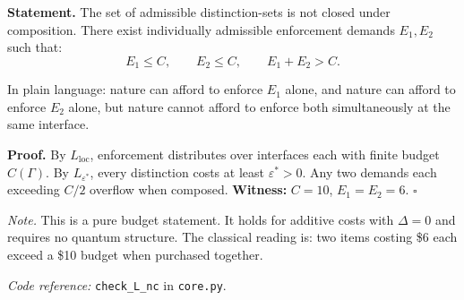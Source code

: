 \documentclass[11pt]{article}
\newcommand{\coderef}[2]{\smallskip\noindent\textit{Code reference:} \texttt{#1} in \texttt{#2}.}
\begin{document}
\begin{tcolorbox}[apfbox, title={Lemma $L_{\mathrm{nc}}^{\mathrm{budget}}$ (Budget Non-Closure)}]
\textbf{Statement.}  The set of admissible distinction-sets is not closed under composition.  There exist individually admissible enforcement demands $E_1, E_2$ such that:
\begin{equation}
E_1 \le C, \qquad E_2 \le C, \qquad E_1 + E_2 > C.
\label{eq:nonclosure}
\end{equation}

In plain language: nature can afford to enforce $E_1$ alone, and nature can afford to enforce $E_2$ alone, but nature cannot afford to enforce both simultaneously at the same interface.

\smallskip\noindent\textbf{Proof.}  By $L_{\mathrm{loc}}$, enforcement distributes over interfaces each with finite budget $C(\Gamma)$.  By $L_{\varepsilon^*}$, every distinction costs at least $\varepsilon^* > 0$.  Any two demands each exceeding $C/2$ overflow when composed.  \textbf{Witness:} $C = 10$, $E_1 = E_2 = 6$.  $\square$

\smallskip\noindent\textit{Note.}  This is a pure budget statement.  It holds for additive costs with $\Delta = 0$ and requires no quantum structure.  The classical reading is: two items costing \$6 each exceed a \$10 budget when purchased together.

\coderef{check\_L\_nc}{core.py}
\end{tcolorbox}
\end{document}
